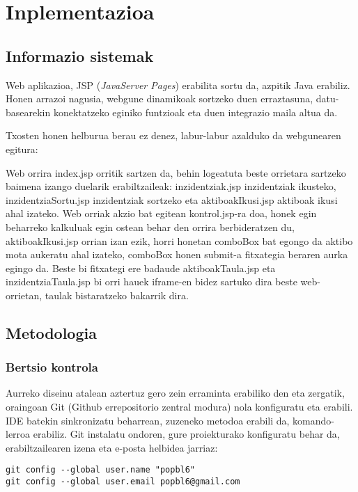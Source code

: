 \section{Inplementazioa}
\subsection{Informazio sistemak}
Web aplikazioa, JSP (\textit{JavaServer Pages}) erabilita sortu da, azpitik Java erabiliz. Honen arrazoi nagusia, webgune dinamikoak sortzeko duen erraztasuna, datu-basearekin konektatzeko eginiko funtzioak eta duen integrazio maila altua da.

Txosten honen helburua berau ez denez, labur-labur azalduko da webgunearen egitura: 

Web orrira index.jsp orritik sartzen da, behin logeatuta beste orrietara sartzeko baimena izango duelarik erabiltzaileak: inzidentziak.jsp inzidentziak ikusteko, inzidentziaSortu.jsp inzidentziak sortzeko eta aktiboakIkusi.jsp aktiboak ikusi ahal izateko. Web orriak akzio bat egitean kontrol.jsp-ra doa, honek egin beharreko kalkuluak egin ostean behar den orrira berbideratzen du, aktiboakIkusi.jsp orrian izan ezik, horri honetan comboBox bat egongo da aktibo mota aukeratu ahal izateko, comboBox honen submit-a fitxategia beraren aurka egingo da. Beste bi fitxategi ere badaude  aktiboakTaula.jsp eta inzidentziaTaula.jsp bi orri hauek iframe-en bidez sartuko dira beste web-orrietan, taulak bistaratzeko bakarrik dira.

\subsection{Metodologia}
\subsubsection{Bertsio kontrola}
\label{sec:gitinp}
Aurreko diseinu atalean aztertuz gero zein erraminta erabiliko den eta zergatik, oraingoan Git (Github errepositorio zentral modura) nola konfiguratu eta erabili. IDE batekin sinkronizatu beharrean, zuzeneko metodoa erabili da, komando-lerroa erabiliz. Git instalatu ondoren, gure proiekturako konfiguratu behar da, erabiltzailearen izena eta e-posta helbidea jarriaz:

\begin{verbatim}
git config --global user.name "popbl6"
git config --global user.email popbl6@gmail.com
\end{verbatim}   

